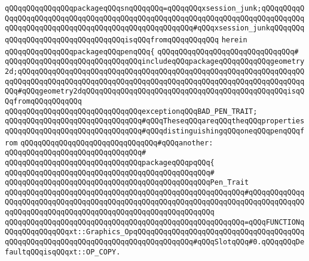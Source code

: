 \verb|qQQqqQQqqQQqqQQqpackageqQQqsnqQQqqQQq=qQQqqQQqxsession_junk;qQQqqQQqqQQqqQQqqQQqqQQqqQQqqQQqqQQqqQQqqQQqqQQqqQQqqQQqqQQqqQQqqQQqqQQqqQQqqQQqqQQqqQQqqQQqqQQqqQQqqQQqqQQqqQQqqQQqqQQqqQQq#qQQqxsession_junkqQQqqQQqqQQqqQQqqQQqqQQqqQQqqQQqqQQqisqQQqfromqQQqqQQqqQQq|\newline
\verb|herein|\newline
\newline
\newline
\verb|qQQqqQQqqQQqqQQqpackageqQQqpenqQQq{|\newline
\verb|qQQqqQQqqQQqqQQqqQQqqQQqqQQqqQQq#|\newline
\verb|qQQqqQQqqQQqqQQqqQQqqQQqqQQqqQQqincludeqQQqpackageqQQqqQQqqQQqgeometry2d;qQQqqQQqqQQqqQQqqQQqqQQqqQQqqQQqqQQqqQQqqQQqqQQqqQQqqQQqqQQqqQQqqQQqqQQqqQQqqQQqqQQqqQQqqQQqqQQqqQQqqQQqqQQqqQQqqQQqqQQqqQQqqQQqqQQqqQQqqQQq#qQQqgeometry2dqQQqqQQqqQQqqQQqqQQqqQQqqQQqqQQqqQQqqQQqqQQqqQQqisqQQqfromqQQqqQQqqQQq|\newline
\newline
\verb|qQQqqQQqqQQqqQQqqQQqqQQqqQQqqQQqexceptionqQQqBAD_PEN_TRAIT;|\newline
\newline
\verb|qQQqqQQqqQQqqQQqqQQqqQQqqQQqqQQq#qQQqTheseqQQqareqQQqtheqQQqproperties|\newline
\verb|qQQqqQQqqQQqqQQqqQQqqQQqqQQqqQQq#qQQqdistinguishingqQQqoneqQQqpenqQQqfrom|\newline
\verb|qQQqqQQqqQQqqQQqqQQqqQQqqQQqqQQq#qQQqanother:|\newline
\verb|qQQqqQQqqQQqqQQqqQQqqQQqqQQqqQQq#|\newline
\verb|qQQqqQQqqQQqqQQqqQQqqQQqqQQqqQQqpackageqQQqpqQQq{|\newline
\verb|qQQqqQQqqQQqqQQqqQQqqQQqqQQqqQQqqQQqqQQqqQQqqQQq#|\newline
\verb|qQQqqQQqqQQqqQQqqQQqqQQqqQQqqQQqqQQqqQQqqQQqqQQqPen_Trait|\newline
\verb|qQQqqQQqqQQqqQQqqQQqqQQqqQQqqQQqqQQqqQQqqQQqqQQqqQQqqQQq#qQQqqQQqqQQqqQQqqQQqqQQqqQQqqQQqqQQqqQQqqQQqqQQqqQQqqQQqqQQqqQQqqQQqqQQqqQQqqQQqqQQqqQQqqQQqqQQqqQQqqQQqqQQqqQQqqQQqqQQqqQQqqQQqqQQq|\newline
\verb|qQQqqQQqqQQqqQQqqQQqqQQqqQQqqQQqqQQqqQQqqQQqqQQqqQQqqQQq=qQQqFUNCTIONqQQqqQQqqQQqqQQqxt::Graphics_OpqQQqqQQqqQQqqQQqqQQqqQQqqQQqqQQqqQQqqQQqqQQqqQQqqQQqqQQqqQQqqQQqqQQqqQQqqQQqqQQqqQQq#qQQqSlotqQQq#0.qQQqqQQqDefaultqQQqisqQQqxt::OP_COPY.|\newline
